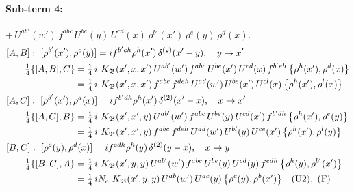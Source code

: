 \documentclass[10pt]{article}
\numberwithin{equation}{section}
\begin{document}
\paragraph{Sub-term 4:} $+\,U^{ab'}(w')\,f^{abc}\,U^{be}(y)\,U^{cd}(x)\,\rho^{b'}(x')\,\rho^{e}(y)\,\rho^{d}(x)$.
\begin{align}
&[A,B]:\ [\rho^{b'}(x'),\rho^{e}(y)]=i f^{b'eh}\rho^{h}(x')\,\delta^{(2)}(x'-y),\quad y\to x'\notag\\
&\qquad \tfrac14\{[A,B],C\}=\tfrac14\,i\,\,K_{\mathfrak B}(x',x,x')\,U^{ab'}(w')\,f^{abc}\,U^{be}(x')\,U^{cd}(x)\,f^{b'eh}\,\big\{\rho^{h}(x'),\rho^{d}(x)\big\}\notag\\
&\qquad\phantom{\tfrac14\{[A,B],C\}}=\tfrac14\,i\,\,K_{\mathfrak B}(x',x,x')\,f^{abc}\,f^{deh}\,U^{ad}(w')\,U^{be}(x')\,U^{cl}(x)\,\big\{\rho^{h}(x'),\rho^{l}(x)\big\}
\label{eq:GI.IV-4-AB}\\
&[A,C]:\ [\rho^{b'}(x'),\rho^{d}(x)]=i f^{b'dh}\rho^{h}(x')\,\delta^{(2)}(x'-x),\quad x\to x'\notag\\
&\qquad \tfrac14\{[A,C],B\}=\tfrac14\,i\,\,K_{\mathfrak B}(x',x',y)\,U^{ab'}(w')\,f^{abc}\,U^{be}(y)\,U^{cd}(x')\,f^{b'dh}\,\big\{\rho^{h}(x'),\rho^{e}(y)\big\}\notag\\
&\qquad\phantom{\tfrac14\{[A,C],B\}}=\tfrac14\,i\,\,K_{\mathfrak B}(x',x',y)\,f^{abc}\,f^{deh}\,U^{ad}(w')\,U^{bl}(y)\,U^{ce}(x')\,\big\{\rho^{h}(x'),\rho^{l}(y)\big\}
\label{eq:GI.IV-4-AC}\\
&[B,C]:\ [\rho^{e}(y),\rho^{d}(x)]=i f^{edh}\rho^{h}(y)\,\delta^{(2)}(y-x),\quad x\to y\notag\\
&\qquad \tfrac14\{[B,C],A\}=\tfrac14\,i\,\,K_{\mathfrak B}(x',y,y)\,U^{ab'}(w')\,f^{abc}\,U^{be}(y)\,U^{cd}(y)\,f^{edh}\,\big\{\rho^{h}(y),\rho^{b'}(x')\big\}\notag\\
&\qquad\phantom{\tfrac14\{[B,C],A\}}=\tfrac14\,i N_{c}\,\,K_{\mathfrak B}(x',y,y)\,U^{ab}(w')\,U^{ac}(y)\,\big\{\rho^{c}(y),\rho^{b}(x')\big\}\quad\text{(U2)},\ \text{(F)}
\label{eq:GI.IV-4-BC}
\end{align}
\end{document}

